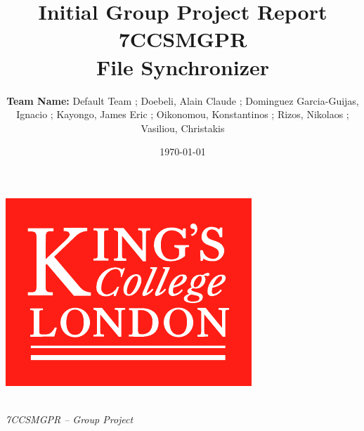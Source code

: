 \documentclass[11pt]{article}
\title{ Initial Group Project Report\\
7CCSMGPR\\[2\baselineskip]
File Synchronizer}
\author{\textbf{Team Name:} Default Team ; Doebeli, Alain Claude ; Dominguez Garcia-Guijas, Ignacio ; Kayongo, James Eric ; 
Oikonomou, Konstantinos ; Rizos, Nikolaos ; Vasiliou, Christakis}
\date{\today}
\begin{document}



\begin{titlepage}
	
	\centering
	
	\hspace{0pt}
	\vspace*{\fill}
	
	\includegraphics*[scale = 1.0]{graphics/kcl-logo-colour.pdf}
	
	\hspace{0pt}
	\vspace*{\fill}
	
	 \\[8mm]
	\large\emph{7CCSMGPR -- Group Project} \\[5mm]
	

\end{titlepage}
\end{document}
